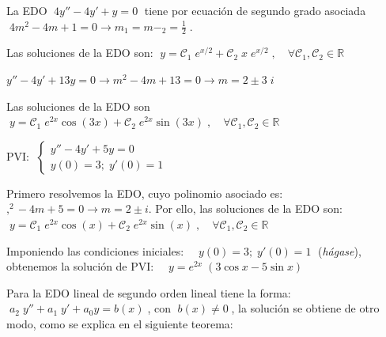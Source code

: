 \begin{ejem}
La EDO $\; 4y''-4y'+y=0\; $ tiene por ecuación de segundo grado asociada $\; 4m^2-4m+1=0 \to m_1=m-_2=\frac 1 2 \; $.

Las soluciones de la EDO son: $\; y=\mathcal{C}_1\; e^{x/2} + \mathcal{C}_2\;x\; e^{x/2} \; , \quad \forall \mathcal{C}_1,\mathcal{C}_2 \in \mathbb R$
\end{ejem}



\begin{ejem}
$y''-4y'+13y=0 \to m^2-4m+13=0 \to 	m=2\pm 3\; i$

Las soluciones de la EDO son $\; y= \mathcal{C}_1\; e^{2x} \cos (3x) + \mathcal{C}_2\; e^{2x} \sin  (3x) \; , \quad \forall \mathcal{C}_1,\mathcal{C}_2 \in \mathbb R$
\end{ejem}



\begin{ejem}
PVI: $\; \begin{cases} y''-4y'+5y=0 \\ y(0)=3; \; y'(0)=1 \end{cases}$

Primero resolvemos la EDO, cuyo polinomio asociado es: $,^2-4m+5=0 \to m=2\pm  i$. Por ello, las soluciones de la EDO son:
$\; y= \mathcal{C}_1\; e^{2x} \cos (x) + \mathcal{C}_2\; e^{2x} \sin  (x) \; , \quad \forall \mathcal{C}_1,\mathcal{C}_2 \in \mathbb R$

Imponiendo las condiciones iniciales: $\quad y(0)=3; \; y'(0)=1 \; $ (\emph{hágase}), obtenemos la solución de PVI: $\quad y=e^{2x}\; (3\cos x-5\sin x)$
	
\end{ejem}

\vspace{3mm}

Para la EDO lineal de segundo orden lineal tiene la forma: $\; a_2\; y'' + a_1	\; y' + a_0 y= b(x)\; $, con $\; b(x) \neq  0\; $, la solución se obtiene de otro modo, como se explica en el siguiente teorema:


